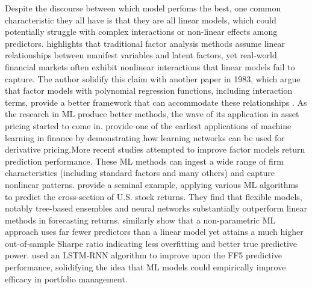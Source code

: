 Despite the discourse between which model perfoms the best, one common characteristic they all have is that they are all linear models, which could potentially struggle with complex interactions or non-linear effects among predictors.  highlights that traditional factor analysis methods assume linear relationships between manifest variables and latent factors, yet real-world financial markets often exhibit nonlinear interactions that linear models fail to capture. The author solidify this claim with another paper in 1983, which argue that factor models with polynomial regression functions, including interaction terms, provide a better framework that can accommodate these relationships \cite{mcdonald_1983}. As the research in ML produce better methods, the wave of its application in asset pricing started to come in.   provide one of the earliest applications of machine learning in finance by demonstrating how learning networks can be used for derivative pricing.More recent studies attempted to improve factor models return prediction performance. These ML methods can ingest a wide range of firm characteristics (including standard factors and many others) and capture nonlinear patterns.  provide a seminal example, applying various ML algorithms to predict the cross-section of U.S. stock returns. They find that flexible models, notably tree-based ensembles and neural networks substantially outperform linear methods in forecasting returns.  similarly show that a non-parametric ML approach uses far fewer predictors than a linear model yet attains a much higher out-of-sample Sharpe ratio indicating less overfitting and better true predictive power.  used an LSTM-RNN algorithm to improve upon the FF5 predictive performance, solidifying the idea that ML models could empirically improve efficacy in portfolio management.

